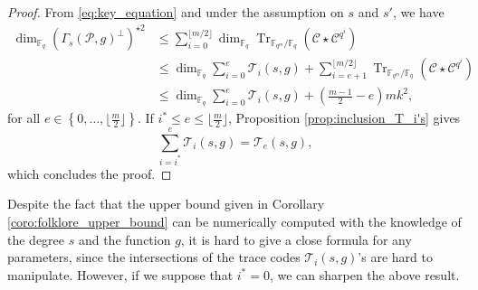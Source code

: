 \documentclass[a4paper]{amsart}
\newtheorem{coro}[thm]{Corollary}
\theoremstyle{definition}
\theoremstyle{remark}
\newcommand{\calP}{\mathcal{P}}
\newcommand{\calL}{\mathcal{L}}
\newcommand{\calC}{\mathcal{C}}
\newcommand{\calT}{\mathcal{T}}
\newcommand{\calX}{\mathcal{X}}
\newcommand{\fqm}{\mathbb{F}_{q^m}}
\newcommand{\fq}{\mathbb{F}_{q}}
\newcommand{\Tr}[1]{\operatorname{Tr}_{\mathbb{F}_{q^m}/\fq}\left(#1\right)}
\newcommand{\set}[1]{\left\{#1\right\}}
\newcommand\mathieu[1]{\textcolor{brown}{#1}}
\begin{document}
%
\begin{proof}
From \eqref{eq:key_equation} and under the assumption on $s$ and $s'$, we have
        \begin{align*}
        \dim_{\fq} (\Gamma_s(\calP,g)^{\perp})^{\star 2}
        & \leq \sum\limits_{i=0}^{\lfloor m/2 \rfloor} \dim_{\fq} \Tr{\calC \star                     \calC^{q^i}} \\
        & \leq \dim_{\fq} \sum\limits_{i=0}^{e}\calT_i(s,g) + \sum\limits_{i=e+1}^{\lfloor m/2 \rfloor} \Tr{\calC \star \calC^{q^i}} \\
                & \leq \dim_{\fq} \sum\limits_{i=0}^{e}\calT_i(s,g) + \left( \frac{m-1}{2} -e \right)mk^2,
        \end{align*}
 for all $e \in \set{0,\dots,\lfloor \frac{m}{2} \rfloor}$. If $i^* \leq e \leq \lfloor \frac{m}{2} \rfloor$,  Proposition \ref{prop:inclusion_T_i's} gives
\[\sum\limits_{i=i^*}^e \calT_i(s,g) = \calT_e(s,g),\]
which concludes the proof.
\end{proof}

Despite the fact that the upper bound given in Corollary \ref{coro:folklore_upper_bound} can be numerically computed with the knowledge of the degree $s$ and the function $g$, it is hard to give a close formula for any parameters, since the intersections of the trace codes $\calT_i(s,g)$'s are hard to manipulate. However, if we suppose that $i^*=0$, we can sharpen the above result.
\end{document}
